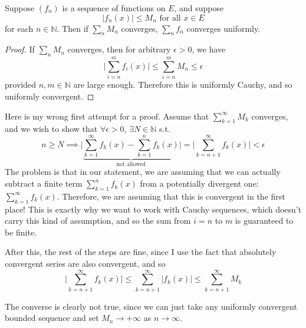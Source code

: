  \begin{theorem}
    Suppose $(f_n)$ is a sequence of functions on $E$, and suppose 
    \begin{equation}
      |f_n (x)| \leq M_n \text{ for all } x \in E
    \end{equation}
    for each $n \in \mathbb{N}$. Then if $\sum_n M_n$ converges, $\sum_n f_n$ converges uniformly.  
  \end{theorem}
  \begin{proof}
    If $\sum_n M_n$ converges, then for arbitrary $\epsilon > 0$, we have 
    \begin{equation}
      \bigg| \sum_{i=n}^m f_i (x) \bigg| \leq \sum_{i = n}^m M_n \leq \epsilon
    \end{equation}
    provided $n, m \in \mathbb{N}$ are large enough. Therefore this is uniformly Cauchy, and so uniformly convergent. 
  \end{proof} 

  Here is my wrong first attempt for a proof. Assume that $\sum_{k=1}^\infty M_k$ converges, and we wish to show that $\forall \epsilon > 0$, $\exists N \in \mathbb{N}$ s.t. 
  \begin{equation}
    n \geq N \implies \bigg| \underbrace{\sum_{k=1}^\infty f_k (x) - \sum_{k=1}^n f_k (x)}_{\text{not allowed}} \bigg| = \bigg| \sum_{k=n+1}^\infty f_k (x) \bigg|< \epsilon 
  \end{equation}
  The problem is that in our statement, we are assuming that we can actually subtract a finite term $\sum_{k=1}^n f_k (x)$ from a potentially divergent one: $\sum_{k=1}^\infty f_k(x)$. Therefore, we are assuming that this is convergent in the first place! This is exactly why we want to work with Cauchy sequences, which doesn't carry this kind of assumption, and so the sum from $i=n$ to $m$ is guaranteed to be finite. 

  After this, the rest of the steps are fine, since I use the fact that absolutely convergent series are also convergent, and so 
  \begin{equation}
    \bigg| \sum_{k=n+1}^\infty f_k (x) \bigg| \leq \sum_{k=n+1}^\infty |f_k (x)| \leq \sum_{k=n+1}^\infty M_k
  \end{equation}

  \begin{example}
    The converse is clearly not true, since we can just take any uniformly convergent bounded sequence and set $M_n \to +\infty$ as $n \to \infty$. 
  \end{example}

